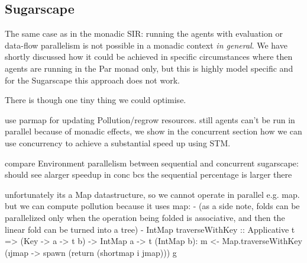 \subsection{Sugarscape}
The same case as in the monadic SIR: running the agents with evaluation or data-flow parallelism is not possible in a monadic context  \textit{in general}. We have shortly discussed how it could be achieved in specific circumstances where then agents are running in the Par monad only, but this is highly model specific and for the Sugarscape this approach does not work. 

There is though one tiny thing we could optimise.

use parmap for updating Pollution/regrow resources. still agents can't be run in parallel because of monadic effects, we show in the concurrent section how we can use concurrency to achieve a substantial speed up using STM.

compare Environment parallelism between sequential and concurrent sugarscape: should see alarger speedup in conc bcs the sequential percentage is larger there

unfortunately its a Map datastructure, so we cannot operate in parallel e.g. map. but we can compute pollution because it uses map:
- (as a side note, folds can be parallelized only when the operation being folded is associative, and then the linear fold can be turned into a tree)
- IntMap traverseWithKey :: Applicative t => (Key -> a -> t b) -> IntMap a -> t (IntMap b):
	m <- Map.traverseWithKey (\i jmap -> spawn (return (shortmap i jmap))) g
	